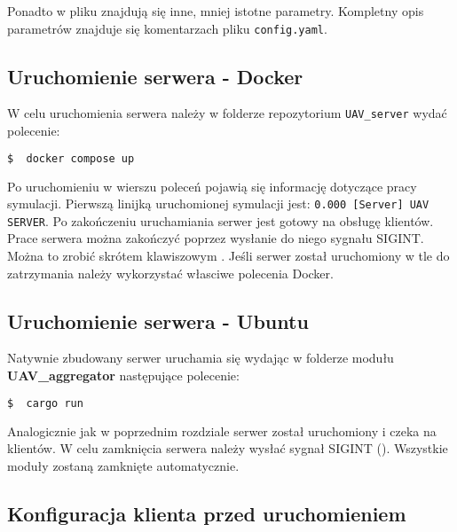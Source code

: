 Ponadto w pliku znajdują się inne, mniej istotne parametry. Kompletny opis parametrów znajduje się komentarzach pliku \texttt{config.yaml}.



\subsection{Uruchomienie serwera - Docker}

W celu uruchomienia serwera należy w folderze repozytorium \texttt{UAV\_server} wydać polecenie:
\begin{lstlisting}[language=bash]
  $  docker compose up
\end{lstlisting}
Po uruchomieniu w wierszu poleceń pojawią się informację dotyczące pracy symulacji. Pierwszą linijką uruchomionej symulacji jest: \texttt{0.000 [Server] UAV SERVER}. Po zakończeniu uruchamiania serwer jest gotowy na obsługę klientów.\\

Prace serwera można zakończyć poprzez wysłanie do niego sygnału SIGINT. Można to zrobić skrótem klawiszowym . Jeśli serwer został uruchomiony w tle do zatrzymania należy wykorzystać własciwe polecenia Docker.

\subsection{Uruchomienie serwera - Ubuntu}

Natywnie zbudowany serwer uruchamia się wydając w folderze modułu\\ \textbf{UAV\_aggregator} następujące polecenie:
\begin{lstlisting}[language=bash]
  $  cargo run
\end{lstlisting}

Analogicznie jak w poprzednim rozdziale serwer został uruchomiony i czeka na klientów. W celu zamknięcia serwera należy wysłać sygnał SIGINT (). Wszystkie moduły zostaną zamknięte automatycznie.

\subsection{Konfiguracja klienta przed uruchomieniem}
\label{fastClient}

